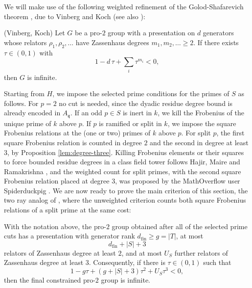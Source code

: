 We will make use of the following weighted refinement of the Golod-Shafarevich theorem \cite{GolodShafarevich}, due to Vinberg \cite{Vinberg} and Koch \cite{Koch} (see also \cite[Chapter III, \S9]{NSW}):

\begin{theorem}\label{thm:wgs}
(Vinberg, Koch)  Let $G$ be a pro-$2$ group with a presentation on $d$ generators whose relators $\rho_1,\rho_2,\dots$ have Zassenhaus degrees $m_1,m_2,\dots\geq2$.  If there exists $\tau\in(0,1)$ with
\[
   1-d\,\tau+\sum_i\tau^{m_i}<0,
\]
then $G$ is infinite.
\end{theorem}

Starting from $H$, we impose the selected prime conditions for the primes of $S$ as follows.  For $p=2$ no cut is needed, since the dyadic residue degree bound is already encoded in $A_{\mathfrak{q}}$.  If an odd $p\in S$ is inert in $k$, we kill the Frobenius of the unique prime of $k$ above $p$.  If $p$ is ramified or split in $k$, we impose the square Frobenius relations at the (one or two) primes of $k$ above $p$.  For split $p$, the first square Frobenius relation is counted in degree $2$ and the second in degree at least $3$, by Proposition \ref{lem:degree-three}.  Killing Frobenius elements or their squares to force bounded residue degrees in a class field tower follows Hajir, Maire and Ramakrishna \cite{HajirMaireRamakrishna}, and the weighted count for split primes, with the second square Frobenius relation placed at degree $3$, was proposed by the MathOverflow user Spiderduckpig \cite{Spiderduckpig}.  We are now ready to prove the main criterion of this section, the two ray analog of \cite[Lemma 11]{Sawin}, where the unweighted criterion counts both square Frobenius relations of a split prime at the same cost:

\begin{theorem}\label{thm:dyadic-gs}
With the notation above, the pro-$2$ group obtained after all of the selected prime cuts has a presentation with generator rank $d_{\mathrm{fin}}\geq g=|T|$, at most
\[
   d_{\mathrm{fin}}+|S|+3
\]
relators of Zassenhaus degree at least $2$, and at most $U_S$ further relators of Zassenhaus degree at least $3$.  Consequently, if there is $\tau\in(0,1)$ such that
\begin{equation}\label{eq:c3}
   1-g\tau+(g+|S|+3)\tau^2+U_S\tau^3<0,
\end{equation}
then the final constrained pro-$2$ group is infinite.
\end{theorem}

